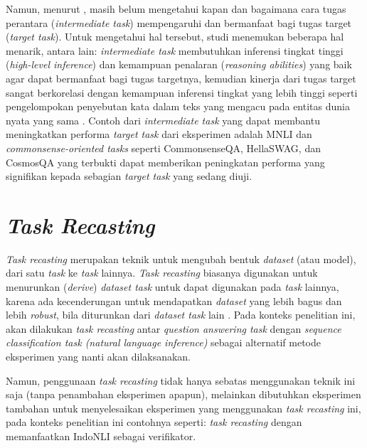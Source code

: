 Namun, menurut \citet{pruksachatkun-etal-2020-intermediate}, masih belum mengetahui kapan dan bagaimana cara tugas perantara (\emph{intermediate task}) mempengaruhi dan bermanfaat bagi tugas target (\emph{target task}). Untuk mengetahui hal tersebut, studi \citet{pruksachatkun-etal-2020-intermediate} menemukan beberapa hal menarik, antara lain: \emph{intermediate task} membutuhkan inferensi tingkat tinggi (\emph{high-level inference}) dan kemampuan penalaran (\emph{reasoning abilities}) yang baik agar dapat bermanfaat bagi tugas targetnya, kemudian kinerja dari tugas target sangat berkorelasi dengan kemampuan inferensi tingkat yang lebih tinggi seperti pengelompokan penyebutan kata dalam teks yang mengacu pada entitas dunia nyata yang sama \citep{coference-resolution}. Contoh dari \emph{intermediate task} yang dapat membantu meningkatkan performa \emph{target task} dari eksperimen \citeauthor{pruksachatkun-etal-2020-intermediate} adalah MNLI dan \emph{commonsense-oriented tasks} seperti CommonsenseQA, HellaSWAG, dan CosmosQA yang terbukti dapat memberikan peningkatan performa yang signifikan kepada sebagian \emph{target task} yang sedang diuji.

\section{\emph{Task Recasting}}
\label{2.7}
\emph{Task recasting} merupakan teknik untuk mengubah bentuk \emph{dataset} (atau model), dari satu \emph{task} ke \emph{task} lainnya. \emph{Task recasting} biasanya digunakan untuk menurunkan (\emph{derive}) \emph{dataset task} untuk dapat digunakan pada \emph{task} lainnya, karena ada kecenderungan untuk mendapatkan \emph{dataset} yang lebih bagus dan lebih \emph{robust}, bila diturunkan dari \emph{dataset task} lain \citep{DBLP:journals/corr/abs-1809-02922}. Pada konteks penelitian ini, akan dilakukan \emph{task recasting} antar \emph{question answering task} dengan \emph{sequence classification task (natural language inference)} sebagai alternatif metode eksperimen yang nanti akan dilaksanakan.

Namun, penggunaan \emph{task recasting} tidak hanya sebatas menggunakan teknik ini saja (tanpa penambahan eksperimen apapun), melainkan dibutuhkan eksperimen tambahan untuk menyelesaikan eksperimen yang menggunakan \emph{task recasting} ini, pada konteks penelitian ini contohnya seperti: \emph{task recasting} dengan memanfaatkan IndoNLI sebagai verifikator.

